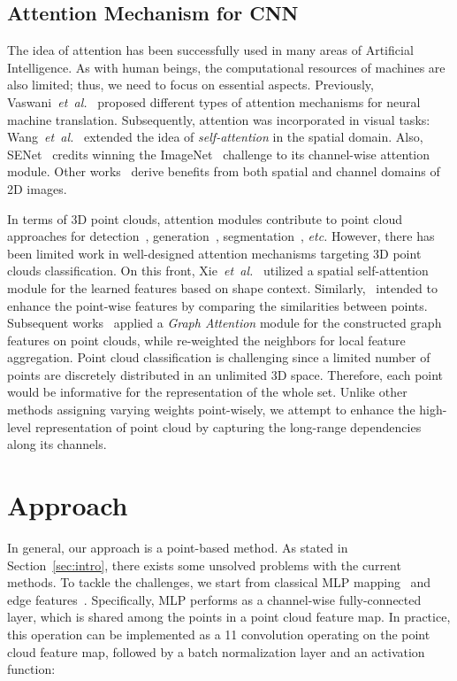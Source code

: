 \documentclass[journal,twoside]{IEEEtran}
\newcommand{\latinphrase}[1]{\textit{#1}}
\newcommand{\etal}{\latinphrase{et~al.}\xspace}
\newcommand{\etc}{\latinphrase{etc.}\xspace}
\begin{document}
\subsection{Attention Mechanism for CNN}
The idea of attention has been successfully used in many areas of Artificial Intelligence. As with human beings, the computational resources of machines are also limited; thus, we need to focus on essential aspects. Previously, Vaswani~\etal~\cite{vaswani2017attention} proposed different types of attention mechanisms for neural machine translation. Subsequently, attention was incorporated in visual tasks: Wang~\etal~\cite{wang2018non} extended the idea of \emph{self-attention} in the spatial domain. Also, SENet~\cite{hu2018squeeze} credits winning the ImageNet~\cite{russakovsky2015imagenet} challenge to its channel-wise attention module. Other works~\cite{woo2018cbam,fu2019dual,li2018harmonious} derive benefits from both spatial and channel domains of 2D images.

In terms of 3D point clouds, attention modules contribute to point cloud approaches for detection~\cite{paigwar2019attentional}, generation~\cite{sun2018pointgrow}, segmentation~\cite{zhang2019pcan,liu2019point2sequence,zhiheng2019pyramnet}, \etc However, there has been limited work in well-designed attention mechanisms targeting 3D point clouds classification. On this front, Xie~\etal~\cite{xie2018attentional} utilized a spatial self-attention module for the learned features based on shape context. Similarly,~\cite{feng2019point, liu2019l2g} intended to enhance the point-wise features by comparing the similarities between points. Subsequent works~\cite{wang2019graph,chen2019gapnet} applied a \emph{Graph Attention} \cite{velivckovic2017graph} module for the constructed graph features on point clouds, while \cite{Hu_2020_CVPR} re-weighted the neighbors for local feature aggregation. Point cloud classification is challenging since a limited number of points are discretely distributed in an unlimited 3D space. Therefore, each point would be informative for the representation of the whole set. Unlike other methods assigning varying weights point-wisely, we attempt to enhance the high-level representation of point cloud by capturing the long-range dependencies along its channels.

\section{Approach}
\label{sec:appr}
In general, our approach is a point-based method. As stated in Section~\ref{sec:intro}, there exists some unsolved problems with the current methods. To tackle the challenges, we start from classical MLP mapping~\cite{qi2017pointnet} and edge features~\cite{wang2019dynamic}. Specifically, MLP performs as a channel-wise fully-connected layer, which is shared among the points in a point cloud feature map. In practice, this operation can be implemented as a 11 convolution operating on the point cloud feature map, followed by a batch normalization layer and an activation function:
\end{document}
